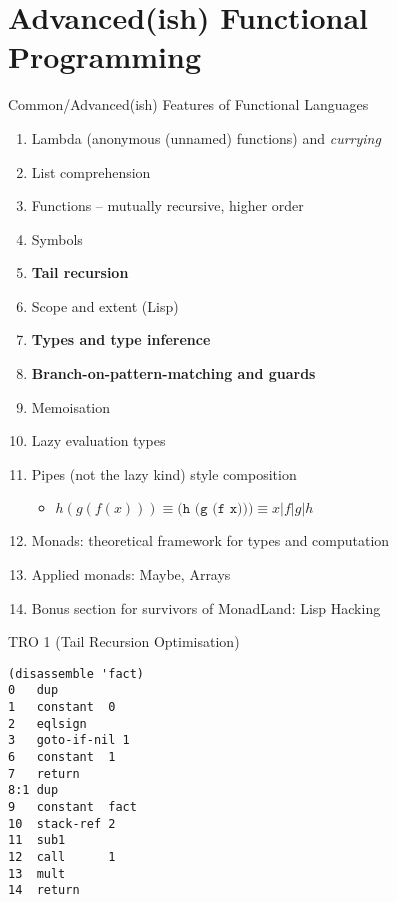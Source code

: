 \documentclass[presentation]{beamer}
\begin{document}
\section{Advanced(ish) Functional Programming}
\begin{frame}{Common/Advanced(ish) Features of Functional Languages}
\label{sec:org95ddb74}

\begin{enumerate}
\item Lambda (anonymous (unnamed) functions) and \emph{currying}
\item List comprehension
\item Functions -- mutually recursive, higher order
\item Symbols
\item \textbf{Tail recursion}
\item Scope and extent (Lisp)
\item \textbf{Types and type inference}
\item \textbf{Branch-on-pattern-matching and guards}
\item Memoisation
\item Lazy evaluation types
\item Pipes (not the lazy kind) style composition
\begin{itemize}
\item  \(h(g(f(x)))\equiv\texttt{(h (g (f x)))}\equiv{}x\vert{f}\vert{g}\vert{h}\)
\end{itemize}
\item Monads: theoretical framework for types and computation
\item Applied monads: Maybe, Arrays
\item Bonus section for survivors of MonadLand: Lisp Hacking
\end{enumerate}

\end{frame}



\begin{frame}[fragile]{TRO 1 (Tail Recursion Optimisation)}
\label{sec:orgd96bf98}
\begin{verbatim}
(disassemble 'fact)
0	dup	  
1	constant  0
2	eqlsign	  
3	goto-if-nil 1
6	constant  1
7	return	  
8:1	dup	  
9	constant  fact
10	stack-ref 2
11	sub1	  
12	call	  1
13	mult	  
14	return	  
\end{verbatim}

\end{frame}
\end{document}
